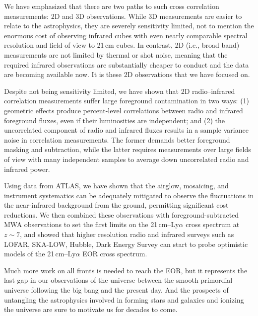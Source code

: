We have emphasized that there are two paths to such cross correlation measurements: 2D and 3D observations. While 3D measurements are easier to relate to the astrophysics, they are severely sensitivity limited, not to mention the enormous cost of observing infrared cubes with even nearly comparable spectral resolution and field of view to 21\,cm cubes. In contrast, 2D (i.e., broad band) measurements are not limited by thermal or shot noise, meaning that the required infrared observations are substantially cheaper to conduct and the data are becoming available now. It is these 2D observations that we have focused on.


Despite not being sensitivity limited, we have shown that 2D radio--infrared correlation measurements suffer large foreground contamination in two ways: (1) geometric effects produce percent-level correlations between radio and infrared foreground fluxes, even if their luminosities are independent; and (2) the uncorrelated component of radio and infrared fluxes results in a sample variance noise in correlation measurements. The former demands better foreground masking and subtraction, while the latter requires measurements over large fields of view with many independent samples to average down uncorrelated radio and infrared power.

Using data from ATLAS, we have shown that the airglow, mosaicing, and instrument systematics can be adequately mitigated to observe the fluctuations in the near-infrared background from the ground, permitting significant cost reductions. We then combined these observations with foreground-subtracted MWA observations to set the first limits on the 21\,cm--Ly$\alpha$ cross spectrum at $z\sim7$, and showed that higher resolution radio and infrared surveys such as LOFAR, SKA-LOW, Hubble, Dark Energy Survey can start to probe optimistic models of the 21\,cm--Ly$\alpha$ EOR cross spectrum.

Much more work on all fronts is needed to reach the EOR, but it represents the last gap in our observations of the universe between the smooth primordial universe following the big bang and the present day. And the prospects of untangling the astrophysics involved in forming stars and galaxies and ionizing the universe are sure to motivate us for decades to come.


